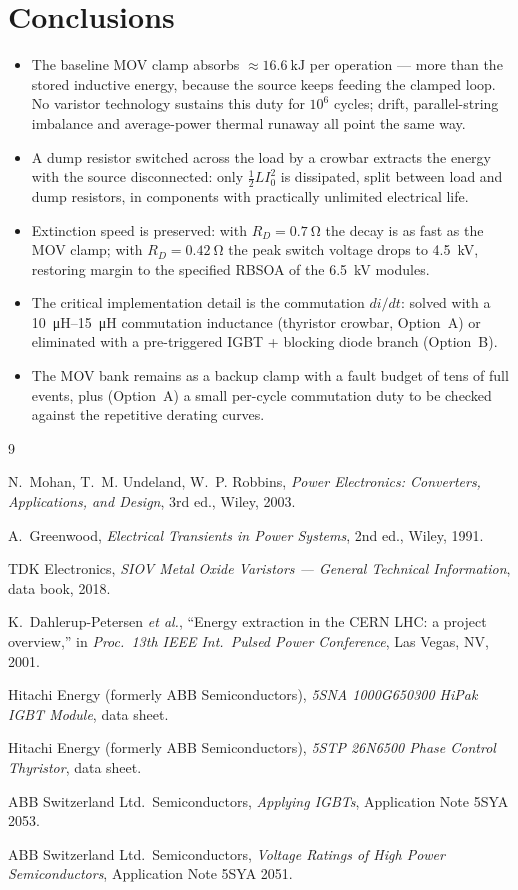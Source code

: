 \documentclass[11pt,a4paper]{article}
\begin{document}
\section{Conclusions}

\begin{itemize}
\item The baseline MOV clamp absorbs $\approx\SI{16.6}{\kilo\joule}$ per
operation --- more than the stored inductive energy, because the source keeps
feeding the clamped loop. No varistor technology sustains this duty for
$10^6$ cycles; drift, parallel-string imbalance and average-power thermal
runaway all point the same way.
\item A dump resistor switched across the load by a crowbar extracts the
energy with the source disconnected: only $\tfrac{1}{2}LI_0^2$ is dissipated,
split between load and dump resistors, in components with practically
unlimited electrical life.
\item Extinction speed is preserved: with $R_D=\SI{0.7}{\ohm}$ the decay is
as fast as the MOV clamp; with $R_D=\SI{0.42}{\ohm}$ the peak switch voltage
drops to \SI{4.5}{\kilo\volt}, restoring margin to the specified RBSOA of the
\SI{6.5}{\kilo\volt} modules.
\item The critical implementation detail is the commutation $di/dt$: solved
with a \SIrange{10}{15}{\micro\henry} commutation inductance (thyristor
crowbar, Option~A) or eliminated with a pre-triggered IGBT + blocking diode
branch (Option~B).
\item The MOV bank remains as a backup clamp with a fault budget of tens of
full events, plus (Option~A) a small per-cycle commutation duty to be checked
against the repetitive derating curves.
\end{itemize}

\begin{thebibliography}{9}

N.~Mohan, T.~M. Undeland, W.~P. Robbins,
\emph{Power Electronics: Converters, Applications, and Design},
3rd ed., Wiley, 2003.

A.~Greenwood,
\emph{Electrical Transients in Power Systems},
2nd ed., Wiley, 1991.

TDK Electronics,
\emph{SIOV Metal Oxide Varistors --- General Technical Information},
data book, 2018.

K.~Dahlerup-Petersen \emph{et al.},
``Energy extraction in the CERN LHC: a project overview,''
in \emph{Proc.\ 13th IEEE Int.\ Pulsed Power Conference},
Las Vegas, NV, 2001.

Hitachi Energy (formerly ABB Semiconductors),
\emph{5SNA 1000G650300 HiPak IGBT Module},
data sheet.

Hitachi Energy (formerly ABB Semiconductors),
\emph{5STP 26N6500 Phase Control Thyristor},
data sheet.

ABB Switzerland Ltd.\ Semiconductors,
\emph{Applying IGBTs},
Application Note 5SYA 2053.

ABB Switzerland Ltd.\ Semiconductors,
\emph{Voltage Ratings of High Power Semiconductors},
Application Note 5SYA 2051.

\end{thebibliography}
\end{document}
